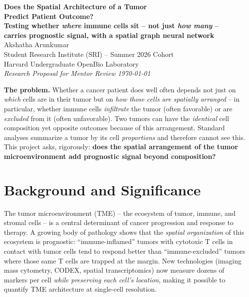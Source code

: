 \documentclass[11pt]{article}
\begin{document}
\begin{center}
  {\LARGE\bfseries\color{sriblue} Does the Spatial Architecture of a Tumor\\ Predict Patient Outcome?}\\[3pt]
  {\large\bfseries\color{sriblue!80!black} Testing whether \emph{where} immune cells sit -- not just \emph{how many} --\\ carries prognostic signal, with a spatial graph neural network}\\[10pt]
  {\large Akshatha Arunkumar}\\[2pt]
  {\small Student Research Institute (SRI) -- Summer 2026 Cohort \\
  Harvard Undergraduate OpenBio Laboratory}\\[2pt]
  {\small\itshape Research Proposal for Mentor Review \quad\textbar\quad \today}
\end{center}

\vspace{2pt}
\begin{problembox}
\textbf{The problem.} Whether a cancer patient does well often depends not just
on \emph{which} cells are in their tumor but on \emph{how those cells are
spatially arranged} -- in particular, whether immune cells \emph{infiltrate} the
tumor (often favorable) or are \emph{excluded} from it (often unfavorable). Two
tumors can have the \emph{identical} cell composition yet opposite outcomes
because of this arrangement. Standard analyses summarize a tumor by its cell
\emph{proportions} and therefore cannot see this. This project asks, rigorously:
\textbf{does the spatial arrangement of the tumor microenvironment add
prognostic signal beyond composition?}
\end{problembox}

\section{Background and Significance}

The tumor microenvironment (TME) -- the ecosystem of tumor, immune, and stromal
cells -- is a central determinant of cancer progression and response to therapy.
A growing body of pathology shows that the \emph{spatial organization} of this
ecosystem is prognostic: ``immune-inflamed'' tumors with cytotoxic T cells in
contact with tumor cells tend to respond better than ``immune-excluded'' tumors
where those same T cells are trapped at the margin. New technologies (imaging
mass cytometry, CODEX, spatial transcriptomics) now measure dozens of markers
per cell \emph{while preserving each cell's location}, making it possible to
quantify TME architecture at single-cell resolution.
\end{document}
